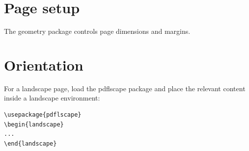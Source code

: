 \documentclass[12pt,a4paper]{article}
\begin{document}
\section{Page setup}
The geometry package controls page dimensions and margins.

\section{Orientation}
For a landscape page, load the pdflscape package and place the relevant
content inside a landscape environment:
\begin{verbatim}
\usepackage{pdflscape}
\begin{landscape}
...
\end{landscape}
\end{verbatim}
\end{document}
